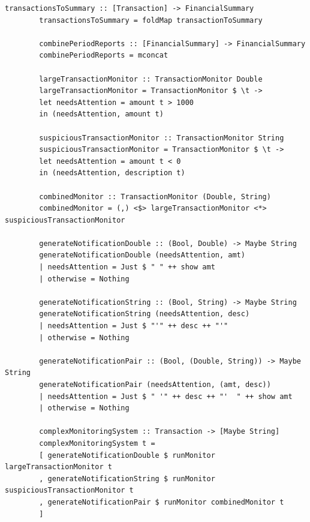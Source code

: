 \documentclass[a4paper, final]{article}
\begin{document}
\begin{lstlisting}[caption={Полный исходный код программы}]
		transactionsToSummary :: [Transaction] -> FinancialSummary
		transactionsToSummary = foldMap transactionToSummary
		
		combinePeriodReports :: [FinancialSummary] -> FinancialSummary
		combinePeriodReports = mconcat  
		
		largeTransactionMonitor :: TransactionMonitor Double
		largeTransactionMonitor = TransactionMonitor $ \t ->
		let needsAttention = amount t > 1000
		in (needsAttention, amount t)
		
		suspiciousTransactionMonitor :: TransactionMonitor String
		suspiciousTransactionMonitor = TransactionMonitor $ \t ->
		let needsAttention = amount t < 0  
		in (needsAttention, description t)
		
		combinedMonitor :: TransactionMonitor (Double, String)
		combinedMonitor = (,) <$> largeTransactionMonitor <*> suspiciousTransactionMonitor
		
		generateNotificationDouble :: (Bool, Double) -> Maybe String
		generateNotificationDouble (needsAttention, amt)
		| needsAttention = Just $ " " ++ show amt
		| otherwise = Nothing
		
		generateNotificationString :: (Bool, String) -> Maybe String
		generateNotificationString (needsAttention, desc)
		| needsAttention = Just $ "'" ++ desc ++ "'"
		| otherwise = Nothing
		
		generateNotificationPair :: (Bool, (Double, String)) -> Maybe String
		generateNotificationPair (needsAttention, (amt, desc))
		| needsAttention = Just $ " '" ++ desc ++ "'  " ++ show amt
		| otherwise = Nothing
		
		complexMonitoringSystem :: Transaction -> [Maybe String]
		complexMonitoringSystem t =
		[ generateNotificationDouble $ runMonitor largeTransactionMonitor t
		, generateNotificationString $ runMonitor suspiciousTransactionMonitor t
		, generateNotificationPair $ runMonitor combinedMonitor t
		]
	\end{lstlisting}
	
\end{document}

